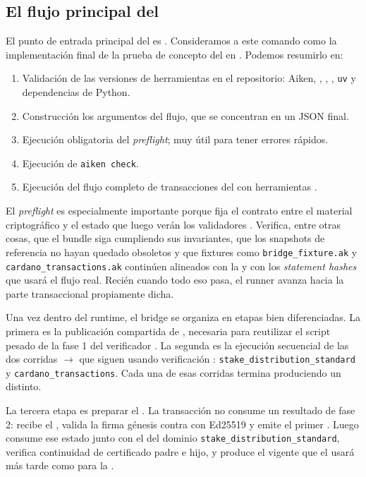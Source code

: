 \subsection{El flujo principal del \zkBridge}
\label{subsec:final-bridge-flow-el-flujo-principal-del-zkbridge}

El punto de entrada principal del \zkBridge es \BridgeRunStrictCommand. Consideramos a este comando como la implementación final de la prueba de concepto del \zkBridge en \Cardano. Podemos resumirlo en:

\begin{enumerate}[noitemsep]
  \item Validación de las versiones de herramientas en el repositorio: Aiken, \Trix, \CShell, \Dolos, \texttt{uv} y dependencias de Python.
  \item Construcción los argumentos \STM del flujo, que se concentran en un JSON final.
  \item Ejecución obligatoria del \textit{preflight}; muy útil para tener errores rápidos.
  \item Ejecución de \texttt{aiken check}.
  \item Ejecución del flujo completo de transacciones del \zkBridge con herramientas \TxThree.
\end{enumerate}

El \textit{preflight} es especialmente importante porque fija el contrato entre el material criptográfico \Offchain y el estado que luego verán los validadores \Onchain. Verifica, entre otras cosas, que el bundle \STM siga cumpliendo sus invariantes, que los snapshots de referencia no hayan quedado obsoletos y que fixtures como \texttt{bridge\_fixture.ak} y \texttt{cardano\_transactions.ak} continúen alineados con la \TxSetRoot y con los \textit{statement hashes} que usará el flujo real. Recién cuando todo eso pasa, el runner avanza hacia la parte transaccional propiamente dicha.

Una vez dentro del runtime, el bridge se organiza en etapas bien diferenciadas. La primera es la publicación compartida de \PublishPhaseOneReferenceScriptTx, necesaria para reutilizar el script pesado de la fase 1 del verificador \STM. La segunda es la ejecución secuencial de las dos corridas \PhaseOneSetupTx $\rightarrow$ \PhaseTwoVerifyTx que siguen usando verificación \HaloTwo \Onchain: \texttt{stake\_distribution\_standard} y \texttt{cardano\_transactions}. Cada una de esas corridas termina produciendo un \ProofReceipt distinto.

La tercera etapa es preparar el \StakeDistributionUTxO. La transacción \StakeDistributionGenesisTxTemplate no consume un resultado de fase 2: recibe el \GenesisCertificate, valida la firma génesis \GenesisSignature contra \GenesisVerificationKey con Ed25519 y emite el primer \StakeDistributionUTxO. Luego \StakeDistributionStandardTxTemplate consume ese estado junto con el \ProofReceipt del dominio \texttt{stake\_distribution\_standard}, verifica continuidad de certificado padre e hijo, y produce el \StakeDistributionUTxO vigente que el \zkBridge usará más tarde como \ReferenceInput para la \MintTx.

